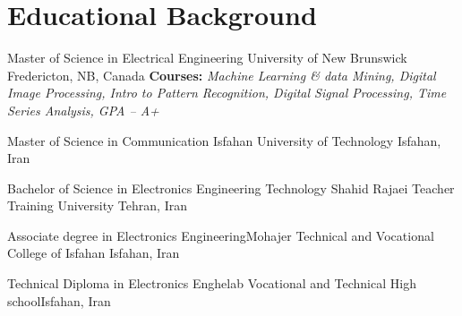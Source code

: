 \section{Educational Background}

{Master of Science in Electrical Engineering}
{University of New Brunswick}
{Fredericton, NB, Canada}
{
\textbf{Courses:} 
    \emph{Machine Learning \& data Mining, Digital Image Processing, Intro to Pattern Recognition, Digital Signal Processing, Time Series Analysis, 
    \textit{GPA -- A+}}
}
{}  

{Master of Science in Communication}
{Isfahan University of Technology}
{Isfahan, Iran}
{}
{}  

{Bachelor of Science in Electronics Engineering Technology}
{Shahid Rajaei Teacher Training University}
{Tehran, Iran}
{}
{}


{Associate degree in Electronics Engineering}{Mohajer Technical and Vocational College of Isfahan}
{Isfahan, Iran}
{}
{}

{Technical Diploma in Electronics}
{Enghelab Vocational and Technical High school}{Isfahan, Iran}
{}
{}

